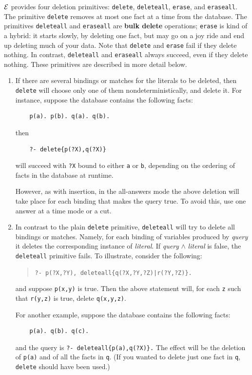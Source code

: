 \documentclass[11pt]{article}
\newcommand{\ERGO}{\mbox{\ensuremath{\cal{E}}\smaller{{\sc{RGO}}}}\xspace}
\newcommand{\FLSYSTEM}{\ERGO}
\begin{document}
\FLSYSTEM provides four deletion primitives: {\tt delete}, {\tt deleteall},
{\tt erase}, and {\tt eraseall}. The primitive {\tt delete} removes at most
one fact at a time from the database. The primitives {\tt deleteall} and
{\tt eraseall} are {\bf bulk delete} operations; {\tt erase} is kind of a
hybrid: it starts slowly, by deleting one fact, but may go on a joy ride
and end up deleting much of your data.
Note that \texttt{delete} and \texttt{erase} fail if they delete nothing.
In contrast, \texttt{deleteall} and \texttt{eraseall} always succeed, even
if they delete nothing.  
These primitives are described in more detail
below.
\begin{enumerate}
\item If there are several bindings or matches for the literals to be
  deleted, then {\tt delete} will choose only one of them
  nondeterministically, and delete it.  For instance, suppose the database
  contains the following facts:
  \begin{verbatim}
    p(a). p(b). q(a). q(b).
  \end{verbatim}
  then
  \begin{verbatim}
    ?- delete{p(?X),q(?X)}
  \end{verbatim}
  will succeed with {\tt ?X} bound to either {\tt a} or {\tt b},
  depending on the ordering of facts in the database at runtime.

  However, as with insertion, in the all-answers mode the above deletion
  will take place for each binding that makes the query true. To avoid
  this, use one answer at a time mode or a cut.
      
\item In contrast to the plain {\tt delete} primitive, {\tt deleteall} will
  try to delete all bindings or matches.  Namely, for each binding of
  variables produced by \emph{query} it deletes the corresponding instance
  of \emph{literal}. If \emph{query} $\wedge$ \emph{literal} is false, the
  {\tt deleteall} primitive fails.  To illustrate, consider the following:
  \begin{quote}
    {\tt ?- p(?X,?Y), deleteall\{q(?X,?Y,?Z)|r(?Y,?Z)\}.}
  \end{quote}
  and suppose {\tt p(x,y)} is true. Then the above statement will, for
  each {\tt z} such that {\tt r(y,z)} is true,
  delete {\tt q(x,y,z)}.
  
  For another example, suppose the database contains the following facts:
  \begin{verbatim}
    p(a). q(b). q(c).
  \end{verbatim}
  and the query is {\tt ?- deleteall\{p(a),q(?X)\}.} The effect will be 
  the deletion of {\tt p(a)} and of all the facts in {\tt q}. (If you
  wanted to delete just one fact in {\tt q}, {\tt delete} should
  have been used.)
  

\end{enumerate}
\end{document}

